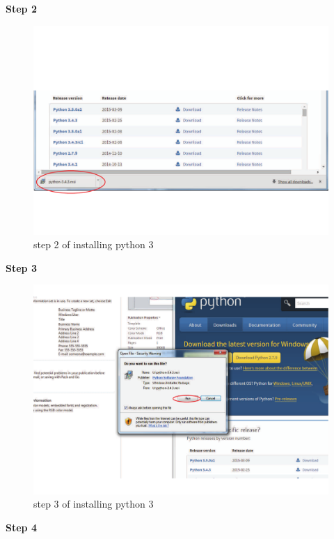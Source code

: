 \textbf{Step 2}

\begin{figure}[H]
    \includegraphics[width=\textwidth]{./Manual/images/python2.pdf}
    \caption{step 2 of installing python 3} \label{fig:installing python3 2}
\end{figure}

\textbf{Step 3}

\begin{figure}[H]
    \includegraphics[width=\textwidth]{./Manual/images/python3.pdf}
    \caption{step 3 of installing python 3} \label{fig:installing python3 3}
\end{figure}

\textbf{Step 4}

